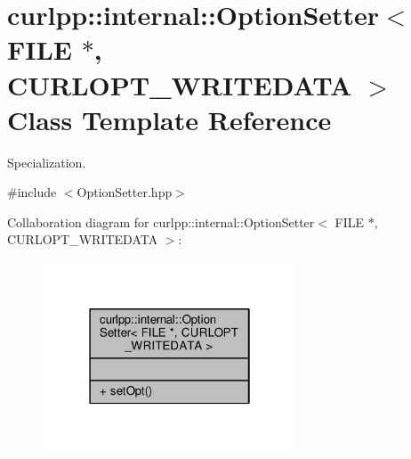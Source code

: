 \hypertarget{classcurlpp_1_1internal_1_1OptionSetter_3_01FILE_01_5_00_01CURLOPT__WRITEDATA_01_4}{\section{curlpp\-:\-:internal\-:\-:Option\-Setter$<$ F\-I\-L\-E $\ast$, C\-U\-R\-L\-O\-P\-T\-\_\-\-W\-R\-I\-T\-E\-D\-A\-T\-A $>$ Class Template Reference}
\label{classcurlpp_1_1internal_1_1OptionSetter_3_01FILE_01_5_00_01CURLOPT__WRITEDATA_01_4}
}


Specialization.  




{\ttfamily \#include $<$Option\-Setter.\-hpp$>$}



Collaboration diagram for curlpp\-:\-:internal\-:\-:Option\-Setter$<$ F\-I\-L\-E $\ast$, C\-U\-R\-L\-O\-P\-T\-\_\-\-W\-R\-I\-T\-E\-D\-A\-T\-A $>$\-:
\nopagebreak
\begin{figure}[H]
\begin{center}
\leavevmode
\includegraphics[width=214pt]{classcurlpp_1_1internal_1_1OptionSetter_3_01FILE_01_5_00_01CURLOPT__WRITEDATA_01_4__coll__graph}
\end{center}
\end{figure}
